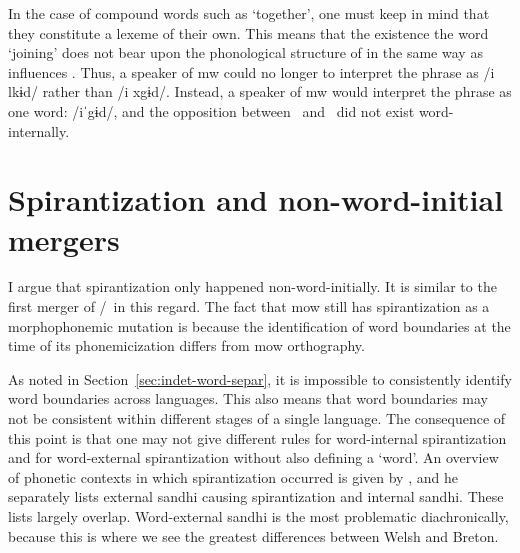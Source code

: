In the case of compound words such as  `together', one must keep in mind that they constitute a lexeme of their own. This means that the existence the word  `joining' does not bear upon the phonological structure of  in the same way as  influences . Thus, a speaker of \gls{mw} could no longer to interpret the phrase  as /i \gls{l}kɨd/ rather than /i \gls{x}gɨd/. Instead, a speaker of \gls{mw} would interpret the phrase as one word: /iˈgɨd/, and the opposition between \lT\ and \xD\ did not exist word-internally.





\section{Spirantization and non-word-initial mergers}
\label{sec:spirantization}

I argue that spirantization only happened non-word-initially.
It is similar to the first merger of \lT/\xD\ in this regard.
The fact that \gls{mow} still has spirantization as a morphophonemic mutation is because the identification of word boundaries at the time of its phonemicization differs from \gls{mow} orthography.

As noted in Section~\ref{sec:indet-word-separ}, it is impossible to consistently identify word boundaries across languages.
This also means that word boundaries may not be consistent within different stages of a single language.
The consequence of this point is that one may not give different rules for word-internal spirantization and for word-external spirantization without also defining a `word'.
An overview of phonetic contexts in which spirantization occurred is given by \textcite[2--3]{schrijver_spirantization_1999}, and he separately lists external sandhi causing spirantization and internal sandhi.
These lists largely overlap.
Word-external sandhi is the most problematic diachronically, because this is where we see the greatest differences between Welsh and Breton.

